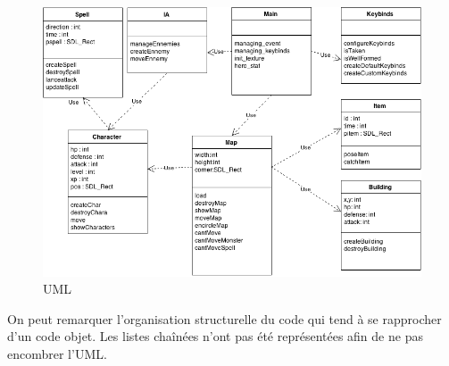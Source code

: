 \begin{figure}[!ht]
    \includegraphics[width=1\textwidth]{./images/uml.png}
    \caption{UML}
\end{figure}

On peut remarquer l'organisation structurelle du code qui tend à se rapprocher d'un code objet. Les listes chaînées n'ont pas été représentées afin de ne pas encombrer l'UML.

